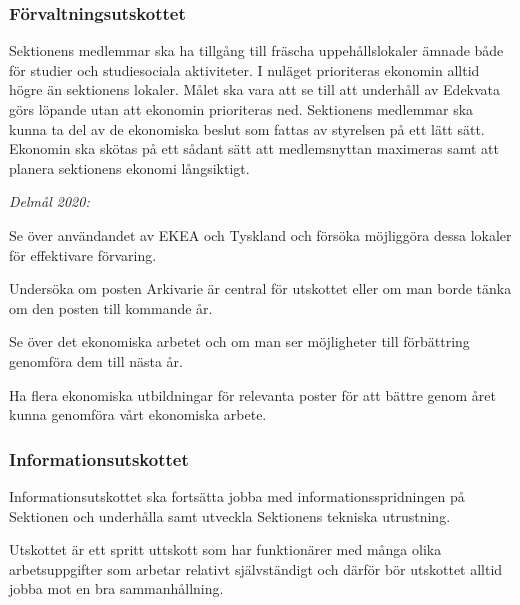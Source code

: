 \documentclass[10pt]{article}
\begin{document}
    \newpage
    
    \subsubsection*{Förvaltningsutskottet}
    
    Sektionens medlemmar ska ha tillgång till fräscha uppehållslokaler ämnade både för studier och studiesociala aktiviteter. I nuläget prioriteras ekonomin alltid högre än sektionens lokaler. Målet ska vara att se till att underhåll av Edekvata görs löpande utan att ekonomin prioriteras ned. Sektionens medlemmar ska kunna ta del av de ekonomiska beslut som fattas av styrelsen på ett lätt sätt. Ekonomin ska skötas på ett sådant sätt att medlemsnyttan maximeras samt att planera sektionens ekonomi långsiktigt.
    
    
    \emph{Delmål 2020:}
    \begin{dashlist}
        \item Se över användandet av EKEA och Tyskland och försöka möjliggöra dessa lokaler för effektivare förvaring.
        \item Undersöka om posten Arkivarie är central för utskottet eller om man borde tänka om den posten till kommande år.
        \item Se över det ekonomiska arbetet och om man ser möjligheter till förbättring genomföra dem till nästa år.
        \item Ha flera ekonomiska utbildningar för relevanta poster för att bättre genom året kunna genomföra vårt ekonomiska arbete.
    \end{dashlist}
    
    \newpage
    
    \subsubsection*{Informationsutskottet}
    Informationsutskottet ska fortsätta jobba med informationsspridningen på Sektionen och underhålla samt utveckla Sektionens tekniska utrustning. 
     
    Utskottet är ett spritt uttskott som har funktionärer med många olika arbetsuppgifter som arbetar relativt självständigt och därför bör utskottet alltid jobba mot en bra sammanhållning.
    
\end{document}
